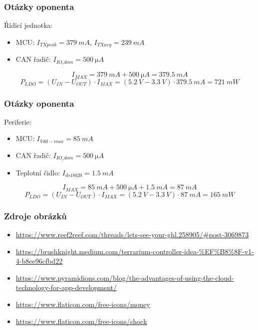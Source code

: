 \documentclass[%
  12pt,       				%
	t,                  %
	aspectratio=1610,   %
	unicode,						%
]{beamer}				    	%
\begin{document}
\begin{frame}[fragile] 
	\frametitle{Otázky oponenta}
	Řídicí jednotka:
	\begin{itemize}
		\item MCU: \(I_{TXpeak}= \qty{379}{mA}\), \(I_{TXavg}= \qty{239}{mA}\)
		\item CAN řadič: \(I_{IO_rdom}=\qty{500}{\micro A} \) 
	\end{itemize}
	\vspace{1cm}
	\begin{equation}
		I_{MAX} = \qty{379}{mA}+\qty{500}{\micro A} = \qty{379.5}{mA}
	\end{equation}
	\vspace{0.5cm}
		\begin{equation}
			P_{LDO} = (U_{IN} - U_{OUT})\cdot I_{MAX} = (\qty{5.2}{V} - \qty{3.3}{V})\cdot \qty{379.5}{mA} = \qty{721}{mW}
		\end{equation}
	\end{frame}

\begin{frame}[fragile] 
	\frametitle{Otázky oponenta}
	Periferie:
	\begin{itemize}
		\item MCU: \(I_{Vdd-max}= \qty{85}{mA}\)
		\item CAN řadič: \(I_{IO_rdom}=\qty{500}{\micro A} \) 
		\item Teplotní čidlo: \(I_{ds18b20} =\qty{1.5}{mA}\) 
	\end{itemize}
	\vspace{1cm}
	\begin{equation}
		I_{MAX} = \qty{85}{mA}+\qty{500}{\micro A}+\qty{1.5}{mA} = \qty{87}{mA}
	\end{equation}
	\vspace{0.5cm}
		\begin{equation}
			P_{LDO} = (U_{IN} - U_{OUT})\cdot I_{MAX} = (\qty{5.2}{V} - \qty{3.3}{V})\cdot \qty{87}{mA} = \qty{165}{mW}
		\end{equation}
	\end{frame}

\begin{frame} [fragile]
	\frametitle{Zdroje obrázků}
	\begin{itemize}
		\item \url{https://www.reef2reef.com/threads/lets-see-your-ghl.258905/#post-3069873}
		\item \url{https://brushknight.medium.com/terrarium-controller-idea-%EF%B8%8F-v1-4-b8ee96cfbd22}
		\item \url{https://www.pyramidions.com/blog/the-advantages-of-using-the-cloud-technology-for-app-development/}
		\item \url{https://www.flaticon.com/free-icons/money}
		\item \url{https://www.flaticon.com/free-icons/shock}
	\end{itemize}			
\end{frame}
\end{document}

